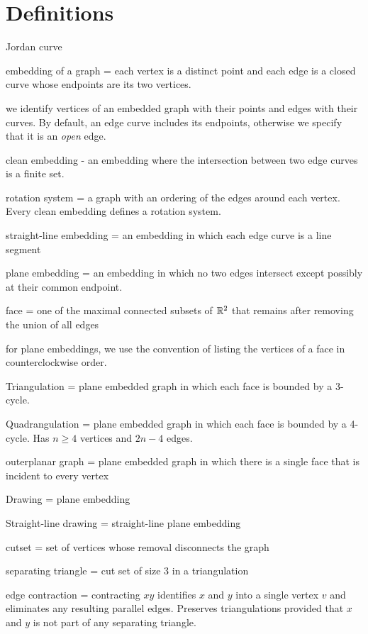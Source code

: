 \documentclass{patmorin}
\begin{document}
\section{Definitions}

Jordan curve

embedding of a graph = each vertex is a distinct point and each edge is a closed curve whose endpoints are its two vertices.  

we identify vertices of an embedded graph with their points and edges with their curves. By default, an edge curve includes its endpoints, otherwise we specify that it is an \emph{open} edge.

clean embedding - an embedding where the intersection between two edge curves is a finite set.  

rotation system = a graph with an ordering of the edges around each vertex. Every clean embedding defines a rotation system.

straight-line embedding = an embedding in which each edge curve is a line segment

plane embedding = an embedding in which no two edges intersect except possibly at their common endpoint.

face = one of the maximal connected subsets of $\mathbb{R}^2$ that remains after removing the union of all edges

for plane embeddings, we use the convention of listing the vertices of a face in counterclockwise order.

Triangulation = plane embedded graph in which each face is bounded by a 3-cycle.

Quadrangulation = plane embedded graph in which each face is bounded by a 4-cycle. Has $n\ge 4$ vertices and $2n-4$ edges.

outerplanar graph = plane embedded graph in which there is a single face that is incident to every vertex

Drawing = plane embedding 

Straight-line drawing = straight-line plane embedding

cutset = set of vertices whose removal disconnects the graph

separating triangle = cut set of size 3 in a triangulation

edge contraction = contracting $xy$ identifies $x$ and $y$ into a single vertex $v$ and eliminates any resulting parallel edges.  Preserves triangulations provided that $x$ and $y$ is not part of any separating triangle.
\end{document}
